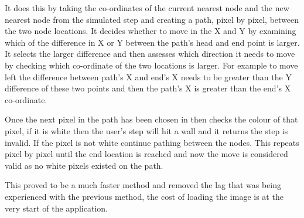 \documentclass[main.tex]{subfiles}
\begin{document}
It does this by taking the co-ordinates of the current nearest node and the new nearest node from the simulated step and creating a path, pixel by pixel, between the two node locations. It decides whether to move in the X and Y by examining which of the difference in X or Y between the path's head and end point is larger. It selects the larger difference and then assesses which direction it needs to move by checking which co-ordinate of the two locations is larger. For example to move left the difference between path's X and end's X needs to be greater than the Y difference of these two points and then the path's X is greater than the end's X co-ordinate.

Once the next pixel in the path has been chosen in then checks the colour of that pixel, if it is white then the user's step will hit a wall and it returns the step is invalid. If the pixel is not white continue pathing between the nodes. This repeats pixel by pixel until the end location is reached and now the move is considered valid as no white pixels existed on the path.

This proved to be a much faster method and removed the lag that was being experienced with the previous method, the cost of loading the image is at the very start of the application.
\end{document}
